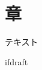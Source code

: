 \documentclass[a4paper]{article}
\begin{document}
\fi

\section{章}
テキスト


\expandafter\ifx\csname ifdraft\endcsname\relax
	
\end{document}
